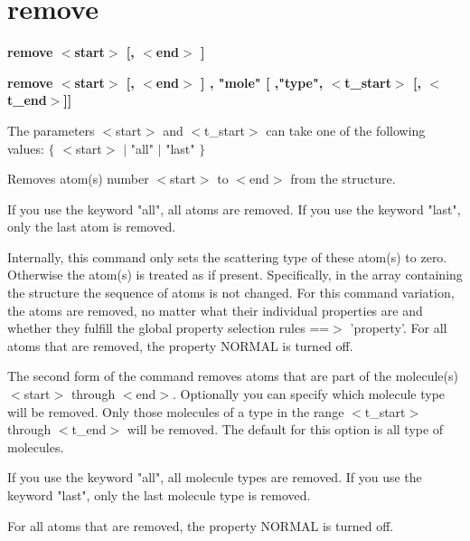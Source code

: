 \section{remove}
{\bf remove $ <$start$> $ [, $ <$end$> $ ] \par }
{\bf remove $ <$start$> $ [, $ <$end$> $ ] , "mole" [ ,"type", $ <$t\_start$> $ [, $ <$t\_end$> $]] \par }
\par
\vspace{3pt}
The parameters $ <$start$> $ and $ <$t\_start$> $ can take one of the following values: 
     $ \{$ $ <$start$> $ $| $ "all" $| $ "last" $\} $ 
\par
Removes atom(s) number $ <$start$> $ to $ <$end$> $ from the structure. 
\par
If you use the keyword "all", all atoms are removed. 
If you use the keyword "last", only the last atom is removed. 
\par
Internally, this command only sets the scattering type of these atom(s) 
to zero. Otherwise the atom(s) is treated as if present. Specifically, 
in the array containing the structure the sequence of atoms is not 
changed. 
For this command variation, the atoms are removed, no 
matter what their individual properties are and whether they fulfill 
the global property selection rules ==$> $ 'property'. 
For all atoms that are removed, the property NORMAL is turned off. 
\par
The second form of the command removes atoms that are part of the 
molecule(s) $ <$start$> $ through $ <$end$> $. 
Optionally you can specify which molecule type will be removed. Only 
those molecules of a type in the range $ <$t\_start$> $ through $ <$t\_end$> $ will 
be removed. The default for this option is all type of molecules. 
\par
If you use the keyword "all", all molecule types are removed. 
If you use the keyword "last", only the last molecule type is removed. 
\par
For all atoms that are removed, the property NORMAL is turned off. 
